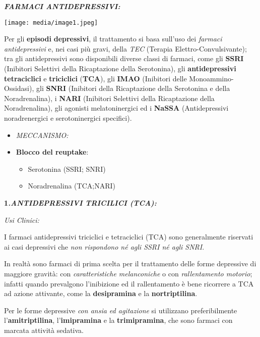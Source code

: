 \documentclass[]{article}
\begin{document}
\textbf{\emph{FARMACI ANTIDEPRESSIVI:}}

\texttt{[image: media/image1.jpeg]}

Per gli \textbf{episodi} \textbf{depressivi}, il trattamento si basa
sull'uso dei \emph{farmaci antidepressivi} e, nei casi più gravi, della
\emph{TEC} (Terapia Elettro-Convulsivante); tra gli antidepressivi sono
disponibili diverse classi di farmaci, come gli \textbf{SSRI} (Inibitori
Selettivi della Ricaptazione della Serotonina), gli
\textbf{antidepressivi tetraciclici} e \textbf{triciclici}
(\textbf{TCA}), gli \textbf{IMAO} (Inibitori delle Monoammino-Ossidasi),
gli \textbf{SNRI} (Inibitori della Ricaptazione della Serotonina e della
Noradrenalina), i \textbf{NARI} (Inibitori Selettivi della Ricaptazione
della Noradrenalina), gli agonisti melatoninergici ed i \textbf{NaSSA}
(Antidepressivi noradrenergici e serotoninergici specifici).

\begin{itemize}
\item
  \emph{MECCANISMO:}
\end{itemize}

\begin{itemize}
\item
  \textbf{Blocco del reuptake}:

  \begin{itemize}
  \item
    Serotonina (SSRI; SNRI)
  \item
    Noradrenalina (TCA;NARI)
  \end{itemize}
\end{itemize}

\textbf{1\emph{.ANTIDEPRESSIVI TRICILICI (TCA):}}

\emph{\emph{Usi Clinici:}}

I farmaci antidepressivi triciclici e tetraciclici (TCA) sono
generalmente riservati ai casi depressivi che \emph{non rispondono né
agli SSRI né agli SNRI}.

In realtà sono farmaci di prima scelta per il trattamento delle forme
depressive di maggiore gravità: con \emph{caratteristiche melanconiche}
o con \emph{rallentamento motorio}; infatti quando prevalgono
l'inibizione ed il rallentamento è bene ricorrere a TCA ad azione
attivante, come la \textbf{desipramina} e la \textbf{nortriptilina}.

Per le forme depressive \emph{con ansia ed agitazione} si utilizzano
preferibilmente l'\textbf{amitriptilina}, l'\textbf{imipramina} e la
\textbf{trimipramina}, che sono farmaci con marcata attività sedativa.
\end{document}
